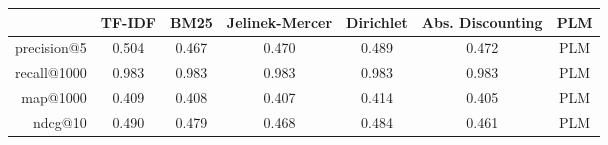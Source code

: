 \begin{center}
  \begin{tabular}{ r | c | c | c | c | c | c }
                & TF-IDF & BM25 & Jelinek-Mercer & Dirichlet & Abs. Discounting & PLM \\ \hline
    precision@5 & 0.504 & 0.467 & 0.470 & 0.489 & 0.472 & PLM \\ \hline
    recall@1000 & 0.983 & 0.983 & 0.983 & 0.983 & 0.983 & PLM \\ \hline
    map@1000    & 0.409 & 0.408 & 0.407 & 0.414 & 0.405 & PLM \\ \hline
    ndcg@10     & 0.490 & 0.479 & 0.468 & 0.484 & 0.461 & PLM \\
    \hline
  \end{tabular}
\end{center}
